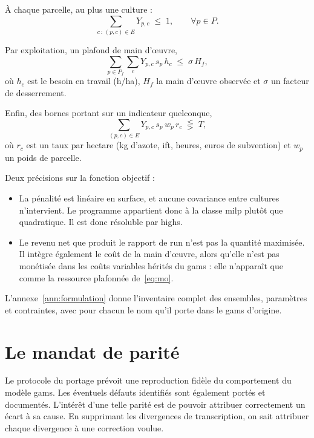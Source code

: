 À chaque parcelle, au plus une culture :
\begin{equation}
  \sum_{c \,:\, (p,c) \in E} Y_{p,c} \;\le\; 1, \qquad \forall p \in P.
  \label{eq:unicite}
\end{equation}

Par exploitation, un plafond de main d'\oe uvre,
\begin{equation}
  \sum_{p \in P_f} \sum_{c} Y_{p,c} \, s_p \, h_c \;\le\; \sigma \, H_f,
  \label{eq:mo}
\end{equation}
où $h_c$ est le besoin en travail (h/ha), $H_f$ la main d'\oe uvre observée et $\sigma$ un
facteur de desserrement.

Enfin, des bornes portant sur un indicateur quelconque,
\begin{equation}
  \sum_{(p,c) \in E} Y_{p,c} \, s_p \, w_p \, r_c \;\lesseqgtr\; T,
  \label{eq:indicateur}
\end{equation}
où $r_c$ est un taux par hectare (kg d'azote, \gls{ift}, heures, euros de subvention) et $w_p$
un poids de parcelle.

Deux précisions sur la fonction objectif :
\begin{itemize}
  \item La pénalité est linéaire en surface, et aucune covariance entre cultures n'intervient. Le
    programme appartient donc à la classe \gls{milp} plutôt que quadratique. Il est donc
    résoluble par \gls{highs}.
  \item Le revenu net que produit le rapport de run n'est pas la quantité maximisée. Il intègre
    également le coût de la main d'\oe uvre, alors qu'elle n'est pas monétisée dans les
    coûts variables hérités du \gls{gams} : elle n'apparaît que comme la ressource plafonnée
    de~\eqref{eq:mo}.
\end{itemize}

L'annexe~\ref{ann:formulation} donne l'inventaire complet des ensembles, paramètres et
contraintes, avec pour chacun le nom qu'il porte dans le \gls{gams} d'origine.


\section{Le mandat de parité}
\label{sec:parite}

Le protocole du portage prévoit une reproduction fidèle du comportement du modèle \gls{gams}.
Les éventuels défauts identifiés sont également portés et documentés. L'intérêt d'une telle
parité est de pouvoir attribuer correctement un écart à sa cause. En supprimant les divergences
de transcription, on sait attribuer chaque divergence à une correction voulue.

